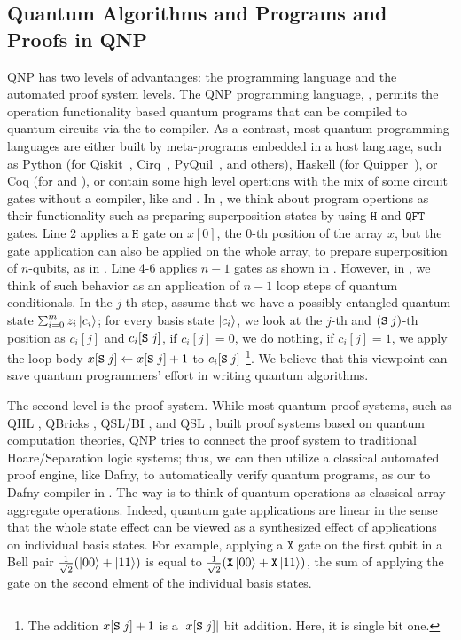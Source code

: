 \subsection{Quantum Algorithms and Programs and Proofs in QNP}

QNP has two levels of advantanges: the programming language and the automated proof system levels.
The QNP programming language, \qafny, permits the operation functionality based quantum programs that can be compiled to quantum circuits via the \qafny to \sqir compiler. As a contrast, most quantum programming languages are either built by meta-programs embedded in a host language, such as Python (for Qiskit~\cite{Qiskit}, Cirq~\cite{cirq}, PyQuil~\cite{PyQuil}, and others), Haskell (for Quipper~\cite{Green2013}), or Coq (for \sqir and \voqc \cite{VOQC}), or contain some high level opertions with the mix of some circuit gates without a compiler, like \cite{sliqlanguage} and \cite{qsharp}.
In \qafny, we think about program opertions as their functionality such as preparing superposition states by using $\texttt{H}$ and $\texttt{QFT}$ gates.  Line 2 applies a $\texttt{H}$ gate on $x[0]$, the $0$-th position of the array $x$, but the gate application can also be applied on the whole array, to prepare superposition of $n$-qubits, as in . Line 4-6 applies $n-1$  gates as shown in . However, in \qafny, we think of such behavior as an application of $n-1$ loop steps of quantum conditionals. In the $j$-th step, assume that we have a possibly entangled quantum state $\schii{m}{z_i}{c_i}$; for every basis state $\left\vert{c_i}\right\rangle$, we look at the $j$-th and $(\texttt{S}\;j)$-th position as $c_i[j]$ and $c_i[\texttt{S}\;j]$, if $c_i[j]=0$, we do nothing, if $c_i[j]=1$, we apply the loop body ${x[\texttt{S}\;j]} \xleftarrow{} {x[\texttt{S}\;j]+1}$ to $c_i[\texttt{S}\;j]$ \footnote{The addition $x[\texttt{S}\;j]+1$ is a $|x[\texttt{S}\;j]|$ bit addition. Here, it is single bit one. }. 
We believe that this viewpoint can save quantum programmers' effort in writing quantum algorithms.

The second level is the proof system. While most quantum proof systems, such as QHL \cite{qhoreusage}, QBricks \cite{qbricks},  QSL/BI \cite{10.1109/LICS52264.2021.9470673}, and QSL \cite{quantumseparation}, built proof systems based on quantum computation theories, QNP tries to connect the \qafny proof system to traditional Hoare/Separation logic systems; thus, we can then utilize a classical automated proof engine, like Dafny, to automatically verify quantum programs, as our \qafny to Dafny compiler in .
The way is to think of \qafny quantum operations as classical array aggregate operations. 
Indeed, quantum gate applications are linear in the sense that the whole state effect can be viewed as a synthesized effect of applications on individual basis states. For example, applying a $\texttt{X}$ gate on the first qubit in a Bell pair $\frac{1}{\sqrt{2}}(\left\vert{00}\right\rangle + \left\vert{11}\right\rangle)$ is equal to $\frac{1}{\sqrt{2}}(\texttt{X}\left\vert{00}\right\rangle + \texttt{X}\left\vert{11}\right\rangle)$, the sum of applying the gate on the second elment of the individual basis states.

